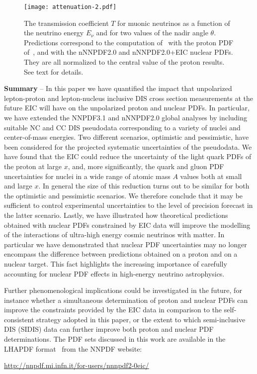 \documentclass[11pt,a4paper]{article}
\newcommand{\myparagraph}[1]{\vspace{0.2cm} \noindent \textbf{#1} --}
\begin{document}
\begin{figure}[!t]
  \centering
  \texttt{[image: attenuation-2.pdf]}
  \caption{The transmission coefficient $T$ for muonic neutrinos as a function
  of the neutrino energy $E_\nu$ and for two values of the nadir angle $\theta$.
  Predictions correspond to the computation of~\cite{Garcia:2020jwr} with the
  proton PDF of~\cite{Gauld:2016kpd}, and with the nNNPDF2.0 and nNNPDF2.0+EIC
  nuclear PDFs. They are all normalized to the central value of the proton
  results. See text for details.}
  \label{fig:attenuation}
\end{figure}

\myparagraph{Summary} In this paper we have quantified the impact that
unpolarized lepton-proton and lepton-nucleus inclusive DIS cross section
measurements at the future EIC will have on the unpolarized proton and nuclear
PDFs. In particular, we have extended the NNPDF3.1 and nNNPDF2.0 global
analyses by including suitable NC and CC DIS pseudodata corresponding to a
variety of nuclei and center-of-mass energies. Two different scenarios,
optimistic and pessimistic, have been considered for the projected systematic
uncertainties of the pseudodata. We have found that the EIC could reduce the
uncertainty of the light quark PDFs of the proton at large $x$, and, more
significantly, the quark and gluon PDF uncertainties for nuclei in a wide range
of atomic mass $A$ values both at small and large $x$. In general the size of
this reduction turns out to be similar for both the optimistic and
pessimistic scenarios. We therefore conclude that it may be sufficient to
control experimental uncertainties to the level of precision forecast in the
latter scenario. Lastly, we have illustrated how theoretical predictions
obtained with nuclear PDFs constrained by EIC data will improve the modelling
of the interactions of ultra-high energy cosmic neutrinos with matter.
In particular we have demonstrated that nuclear PDF uncertainties may
no longer encompass the difference between predictions obtained on a proton and
on a nuclear target. This fact highlights the increasing importance of carefully
accounting for nuclear PDF effects in high-energy neutrino astrophysics.

Further phenomenological implications could be investigated
in the future, for instance whether a simultaneous determination of proton and
nuclear PDFs can improve the constraints provided by the EIC data in comparison
to the self-consistent strategy adopted in this paper, or the extent to which
semi-inclusive DIS (SIDIS) data can further improve both proton and nuclear
PDF determinations. The PDF sets discussed in this work are available in the
LHAPDF format~\cite{Buckley:2014ana} from the NNPDF website:
\begin{center}
\url{http://nnpdf.mi.infn.it/for-users/nnnpdf2-0eic/}
\end{center}
\end{document}
